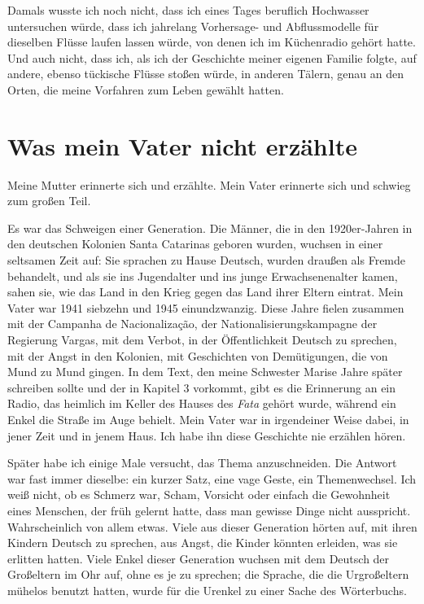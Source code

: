 \documentclass[
  ngerman,
  11pt,
  openany]{book}
\begin{document}
Damals wusste ich noch nicht, dass ich eines Tages beruflich Hochwasser
untersuchen würde, dass ich jahrelang Vorhersage- und Abflussmodelle für
dieselben Flüsse laufen lassen würde, von denen ich im Küchenradio
gehört hatte. Und auch nicht, dass ich, als ich der Geschichte meiner
eigenen Familie folgte, auf andere, ebenso tückische Flüsse stoßen
würde, in anderen Tälern, genau an den Orten, die meine Vorfahren zum
Leben gewählt hatten.

\section{Was mein Vater nicht
erzählte}\label{was-mein-vater-nicht-erzuxe4hlte}

Meine Mutter erinnerte sich und erzählte. Mein Vater erinnerte sich und
schwieg zum großen Teil.

Es war das Schweigen einer Generation. Die Männer, die in den
1920er-Jahren in den deutschen Kolonien Santa Catarinas geboren wurden,
wuchsen in einer seltsamen Zeit auf: Sie sprachen zu Hause Deutsch,
wurden draußen als Fremde behandelt, und als sie ins Jugendalter und ins
junge Erwachsenenalter kamen, sahen sie, wie das Land in den Krieg gegen
das Land ihrer Eltern eintrat. Mein Vater war 1941 siebzehn und 1945
einundzwanzig. Diese Jahre fielen zusammen mit der Campanha de
Nacionalização, der Nationalisierungskampagne der Regierung Vargas, mit
dem Verbot, in der Öffentlichkeit Deutsch zu sprechen, mit der Angst in
den Kolonien, mit Geschichten von Demütigungen, die von Mund zu Mund
gingen. In dem Text, den meine Schwester Marise Jahre später schreiben
sollte und der in Kapitel 3 vorkommt, gibt es die Erinnerung an ein
Radio, das heimlich im Keller des Hauses des \emph{Fata} gehört wurde,
während ein Enkel die Straße im Auge behielt. Mein Vater war in
irgendeiner Weise dabei, in jener Zeit und in jenem Haus. Ich habe ihn
diese Geschichte nie erzählen hören.

Später habe ich einige Male versucht, das Thema anzuschneiden. Die
Antwort war fast immer dieselbe: ein kurzer Satz, eine vage Geste, ein
Themenwechsel. Ich weiß nicht, ob es Schmerz war, Scham, Vorsicht oder
einfach die Gewohnheit eines Menschen, der früh gelernt hatte, dass man
gewisse Dinge nicht ausspricht. Wahrscheinlich von allem etwas. Viele
aus dieser Generation hörten auf, mit ihren Kindern Deutsch zu sprechen,
aus Angst, die Kinder könnten erleiden, was sie erlitten hatten. Viele
Enkel dieser Generation wuchsen mit dem Deutsch der Großeltern im Ohr
auf, ohne es je zu sprechen; die Sprache, die die Urgroßeltern mühelos
benutzt hatten, wurde für die Urenkel zu einer Sache des Wörterbuchs.
\end{document}
